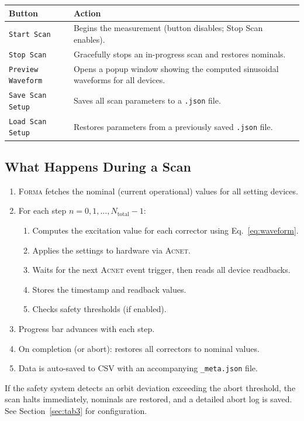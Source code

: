 \documentclass[11pt,a4paper,twoside]{report}
\newcommand{\forma}{\textsc{Forma}}
\newcommand{\acnet}{\textsc{Acnet}}
\newcommand{\btn}[1]{\colorbox{accent!12}{\texttt{\small #1}}}
\begin{document}
\begin{tabularx}{\textwidth}{lX}
  \toprule
  \textbf{Button} & \textbf{Action} \\
  \midrule
  \btn{Start Scan}       & Begins the measurement (button disables; Stop Scan enables). \\
  \btn{Stop Scan}        & Gracefully stops an in-progress scan and restores nominals. \\
  \btn{Preview Waveform} & Opens a popup window showing the computed sinusoidal waveforms for all devices. \\
  \btn{Save Scan Setup}  & Saves all scan parameters to a \texttt{.json} file. \\
  \btn{Load Scan Setup}  & Restores parameters from a previously saved \texttt{.json} file. \\
  \bottomrule
\end{tabularx}

\subsection{What Happens During a Scan}

\begin{enumerate}
  \item \forma{} fetches the nominal (current operational) values for all setting devices.
  \item For each step $n = 0, 1, \ldots, N_{\text{total}}{-}1$:
    \begin{enumerate}[label=(\alph*)]
      \item Computes the excitation value for each corrector using Eq.~\ref{eq:waveform}.
      \item Applies the settings to hardware via \acnet{}.
      \item Waits for the next \acnet{} event trigger, then reads all device readbacks.
      \item Stores the timestamp and readback values.
      \item Checks safety thresholds (if enabled).
    \end{enumerate}
  \item Progress bar advances with each step.
  \item On completion (or abort): restores all correctors to nominal values.
  \item Data is auto-saved to CSV with an accompanying \texttt{\_meta.json} file.
\end{enumerate}

\begin{dangerbox}
If the safety system detects an orbit deviation exceeding the abort threshold, the scan halts immediately, nominals are restored, and a detailed abort log is saved. See Section~\ref{sec:tab3} for configuration.
\end{dangerbox}
\end{document}

